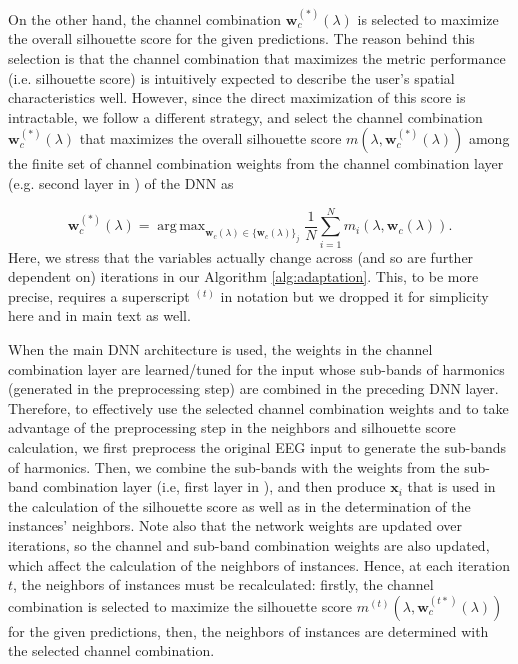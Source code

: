 \documentclass[12pt]{iopart}
\DeclareMathOperator*{\argmax}{arg\,max}
\newcommand{\matr}[1]{\mathbf{#1}}
\begin{document}
On the other hand, the channel combination $\matr{w}_c^{(*)}(\lambda)$ is selected to maximize the overall silhouette score for the given predictions. The reason behind this selection is that the channel combination that maximizes the metric performance (i.e. silhouette score) is intuitively expected to describe the user's spatial characteristics well. However, since the direct maximization of this score is intractable, we follow a different strategy, and select the channel combination $\matr{w}_c^{(*)}(\lambda)$ that maximizes the overall silhouette score $m(\lambda,\matr{w}_c^{(*)}(\lambda))$ among the finite set of channel combination weights from the channel combination layer (e.g. second layer in \cite{ournetwork}) of the DNN as

\begin{equation*}
        {\matr{w}_c^{(*)}}(\lambda) = \argmax_{\matr{w}_c(\lambda) \in \{\matr{w}_c(\lambda)\}_j} 
    \frac{1}{N}\sum_{i=1}^{N} m_i(\lambda,\matr{w}_c(\lambda)).
     \label{eq:best_channel_comb}
\end{equation*}
Here, we stress that the variables actually change across (and so are further dependent on) iterations in our Algorithm \ref{alg:adaptation}. This, to be more precise, requires a superscript $^{(t)}$ in notation but we dropped it for simplicity here and in main text as well.

When the main DNN architecture \cite{ournetwork} is used, the weights in the channel combination layer are learned/tuned for the input whose sub-bands of harmonics (generated in the preprocessing step) are combined in the preceding DNN layer. Therefore, to effectively use the selected channel combination weights and to take advantage of the preprocessing step in the neighbors and silhouette score calculation, we first preprocess the original EEG input to generate the sub-bands of harmonics. Then, we combine the sub-bands with the weights from the sub-band combination layer (i.e, first layer in \cite{ournetwork}), and then produce $\matr{x}_i$ that is used in the calculation of the silhouette score as well as in the determination of the instances' neighbors. Note also that the network weights are updated over iterations, so the channel and sub-band combination weights are also updated, which affect the calculation of the neighbors of instances. Hence, at each iteration $t$, the neighbors of instances must be recalculated: firstly, the channel combination is selected to maximize the silhouette score $m^{(t)}(\lambda,\matr{w}_c^{(t*)}(\lambda))$ for the given predictions, then, the neighbors of instances are determined with the selected channel combination.
\end{document}
